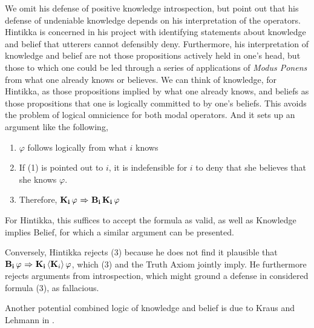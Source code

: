 We omit his defense of positive knowledge introspection, but point out that his defense of undeniable knowledge depends on his interpretation of the operators. Hintikka is concerned in his project with identifying statements about knowledge and belief that utterers cannot defensibly deny. Furthermore, his interpretation of knowledge and belief are not those propositions actively held in one's head, but those to which one could be led through a series of applications of \emph{Modus Ponens} from what one already knows or believes. We can think of knowledge, for Hintikka, as those propositions implied by what one already knows, and beliefs as those propositions that one is logically committed to by one's beliefs. This avoids the problem of logical omnicience for both modal operators. And it sets up an argument like the following, 
\begin{enumerate}
	\item $\varphi$ follows logically from what $i$ knows
	\item If (1) is pointed out to $i$, it is indefensible for $i$ to deny that she believes that she knows $\varphi$.
	\item Therefore, $\mathbf{K}_{\mathbf{i}}\,\varphi {\ \Rightarrow \ } \mathbf{B}_{\mathbf{i}}\,\mathbf{K}_{\mathbf{i}}\,\varphi$
\end{enumerate}

For Hintikka, this suffices to accept the formula as valid, as well as Knowledge implies Belief, for which a similar argument can be presented.

Conversely, Hintikka rejects (3) because he does not find it plausible that \\$\mathbf{B}_{\mathbf{i}}\,\varphi {\ \Rightarrow \ } \mathbf{K}_{\mathbf{i}}\,\langle \mathbf{K}_{i} \rangle\,\varphi$, which (3) and the Truth Axiom jointly imply. He furthermore rejects arguments from introspection, which might ground a defense in considered formula (3), as fallacious. 

Another potential combined logic of knowledge and belief is due to Kraus and Lehmann in \cite{KrausLehmann}.

